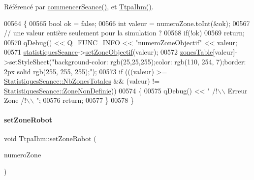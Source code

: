 Référencé par \hyperlink{class_ttpa_ihm_a9bf7a4cddbdbf786d781e4d084409068}{commencer\+Seance()}, et \hyperlink{class_ttpa_ihm_ab3ed4b37a93ff04842414d4a98861d66}{Ttpa\+Ihm()}.


\begin{DoxyCode}
00564 \{
00565     \textcolor{keywordtype}{bool} ok = \textcolor{keyword}{false};
00566     \textcolor{keywordtype}{int} valeur = numeroZone.toInt(&ok);
00567     \textcolor{comment}{// une valeur entière seulement pour la simulation ?}
00568     \textcolor{keywordflow}{if}(!ok)
00569         \textcolor{keywordflow}{return};
00570     qDebug() << Q\_FUNC\_INFO << \textcolor{stringliteral}{"numeroZoneObjectif"} << valeur;
00571     \hyperlink{class_ttpa_ihm_abed6897d6f7b4d3a5eb8dcc07651e740}{statistiquesSeance}->\hyperlink{class_statistiques_seance_af7c8281e195c0822463e6747bd0695ef}{setZoneObjectif}(valeur);
00572     \hyperlink{class_ttpa_ihm_af77d75f1aa3eb901b9410e5fc465ece8}{zonesTable}[valeur]->setStyleSheet(\textcolor{stringliteral}{"background-color: rgb(25,25,255);color: rgb(110, 254,
       7);border: 2px solid rgb(255, 255, 255);"});
00573     \textcolor{keywordflow}{if} (((valeur) >= \hyperlink{class_statistiques_seance_aa839f5192cbadd7c3fb3651d62eff8b5afe19f73563963b5160847cdd8c2260c4}{StatistiquesSeance::NbZonesTotales} && (valeur) != 
      \hyperlink{class_statistiques_seance_aa839f5192cbadd7c3fb3651d62eff8b5afaee4b0051f413cbba9651905daeba28}{StatistiquesSeance::ZoneNonDefinie}))
00574     \{
00575         qDebug() << \textcolor{stringliteral}{" /!\(\backslash\)\(\backslash\) Erreur Zone /!\(\backslash\)\(\backslash\) "};
00576         \textcolor{keywordflow}{return};
00577     \}
00578 \}
\end{DoxyCode}
\mbox{\label{class_ttpa_ihm_abda1a93ec09ec404b129e08876faa5f8}} 
\paragraph{\texorpdfstring{set\+Zone\+Robot}{setZoneRobot}}
{\footnotesize\ttfamily void Ttpa\+Ihm\+::set\+Zone\+Robot (\begin{DoxyParamCaption}\item[{Q\+String}]{numero\+Zone }\end{DoxyParamCaption})\hspace{0.3cm}{\ttfamily [slot]}}


